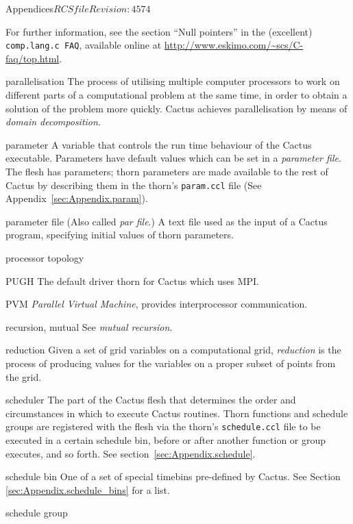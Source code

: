 \begin{cactuspart}{Appendices}{$RCSfile$}{$Revision: 4574 $}
\begin{Lentry}
  For further information, see the section ``Null pointers''
  in the (excellent) {\tt comp.lang.c FAQ}, available online at
  \url{http://www.eskimo.com/~scs/C-faq/top.html}.
\item[parallelisation]
  The process of utilising multiple computer processors to work on different
  parts of a computational problem at the same time, in order to obtain a
  solution of the problem more quickly.  Cactus achieves parallelisation
  by means of \textit{domain decomposition}.
\item[parameter]
  A variable that controls the run time behaviour of the Cactus executable.
  Parameters have default values which can be set in a
  \textit{parameter file}.%
  The flesh has parameters; thorn parameters are made available to the rest
  of Cactus by describing them in the thorn's 
  {\tt param.ccl} file (See Appendix~\ref{sec:Appendix.param}).
\item[parameter file]
  (Also called \textit{par file}.) A text file used as the input of a
  Cactus program, specifying initial values of thorn parameters.
\item[processor topology]
\item[PUGH]
  The default driver thorn for Cactus which uses MPI.
\item[PVM]
  \textit{Parallel Virtual Machine}, provides interprocessor communication.
\item[recursion, mutual]
  See \textit{mutual recursion}.
\item[reduction]
  Given a set of grid variables on a computational grid, \textit{reduction} 
  is the process of producing values for the variables on a proper subset of
  points from the grid.
\item[scheduler]
  The part of the Cactus flesh that determines the order and circumstances
  in which to execute Cactus routines.  Thorn functions and schedule groups 
  are registered with the flesh via the thorn's {\tt schedule.ccl} file to
  be executed in a certain schedule bin, before or after another function 
  or group executes, and so forth.
  See section~\ref{sec:Appendix.schedule}.
\item[schedule bin]
  One of a set of special timebins pre-defined by Cactus.
  See Section \ref{sec:Appendix.schedule_bins} for a list.
\item[schedule group]

\end{Lentry}
\end{cactuspart}
